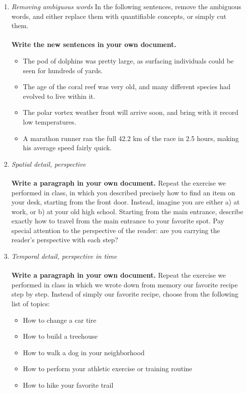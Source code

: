 \documentclass{article}
\begin{document}
\begin{enumerate}
\item \textit{Removing ambiguous words}  In the following sentences, remove the ambiguous words, and either replace them with quantifiable concepts, or simply cut them. \\ \\
\textbf{Write the new sentences in your own document.} 
\begin{itemize}
\item The pod of dolphins was pretty large, as surfacing individuals could be seen for hundreds of yards.
\item The age of the coral reef was very old, and many different species had evolved to live within it.
\item The polar vortex weather front will arrive soon, and bring with it record low temperatures.
\item A marathon runner ran the full 42.2 km of the race in 2.5 hours, making his average speed fairly quick.
\end{itemize}
\item \textit{Spatial detail, perspective}  \\ \\
\textbf{Write a paragraph in your own document.}  Repeat the exercise we performed in class, in which you described precisely how to find an item on your desk, starting from the front door. Instead, imagine you are either a) at work, or b) at your old high school.  Starting from the main entrance, describe exactly how to travel from the main entrance to your favorite spot.  Pay special attention to the perspective of the reader: are you carrying the reader's perspective with each step?
\item \textit{Temporal detail, perspective in time} \\ \\
\textbf{Write a paragraph in your own document.}  Repeat the exercise we performed in class in which we wrote down from memory our favorite recipe step by step.  Instead of simply our favorite recipe, choose from the following list of topics:
\begin{itemize}
\item How to change a car tire
\item How to build a treehouse
\item How to walk a dog in your neighborhood
\item How to perform your athletic exercise or training routine
\item How to hike your favorite trail

\end{itemize}
\end{enumerate}
\end{document}
